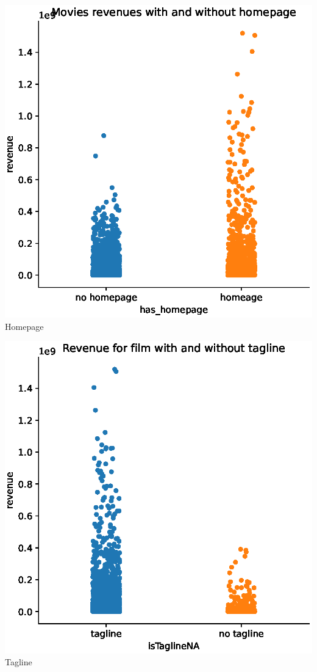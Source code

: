 \begin{center}
  \begin{minipage}{0.3\linewidth}
  \centering
    \includegraphics[width=0.8\linewidth]{figures//has_homepage.eps}
  {\small{Homepage}}
  \end{minipage}
  \hfill
  \begin{minipage}{0.3\linewidth}
  \centering
    \includegraphics[width=0.8\linewidth]{figures//isTanglineNA.eps}
  {\small{Tagline}}
  \end{minipage}
  \hfill
  \begin{minipage}{0.3\linewidth}

\end{minipage}
\end{center}
